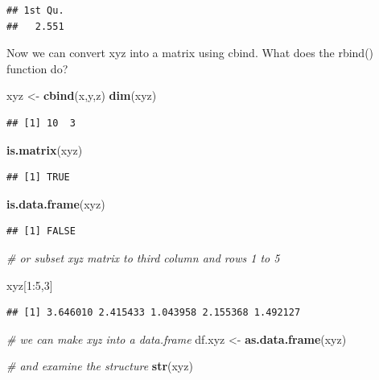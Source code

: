 \documentclass[]{article}
\newenvironment{Shaded}{}{}
\newcommand{\KeywordTok}[1]{\textcolor[rgb]{0.00,0.44,0.13}{\textbf{{#1}}}}
\newcommand{\DecValTok}[1]{\textcolor[rgb]{0.25,0.63,0.44}{{#1}}}
\newcommand{\StringTok}[1]{\textcolor[rgb]{0.25,0.44,0.63}{{#1}}}
\newcommand{\CommentTok}[1]{\textcolor[rgb]{0.38,0.63,0.69}{\textit{{#1}}}}
\newcommand{\NormalTok}[1]{{#1}}
\begin{document}
\begin{verbatim}
## 1st Qu. 
##   2.551
\end{verbatim}

Now we can convert xyz into a matrix using cbind. What does the rbind()
function do?

\begin{Shaded}
\begin{Highlighting}[]
\NormalTok{xyz <-}\StringTok{ }\KeywordTok{cbind}\NormalTok{(x,y,z)}
\KeywordTok{dim}\NormalTok{(xyz)}
\end{Highlighting}
\end{Shaded}

\begin{verbatim}
## [1] 10  3
\end{verbatim}

\begin{Shaded}
\begin{Highlighting}[]
\KeywordTok{is.matrix}\NormalTok{(xyz)}
\end{Highlighting}
\end{Shaded}

\begin{verbatim}
## [1] TRUE
\end{verbatim}

\begin{Shaded}
\begin{Highlighting}[]
\KeywordTok{is.data.frame}\NormalTok{(xyz)}
\end{Highlighting}
\end{Shaded}

\begin{verbatim}
## [1] FALSE
\end{verbatim}

\begin{Shaded}
\begin{Highlighting}[]
\CommentTok{# or subset xyz matrix to third column and rows 1 to 5}

\NormalTok{xyz[}\DecValTok{1}\NormalTok{:}\DecValTok{5}\NormalTok{,}\DecValTok{3}\NormalTok{]}
\end{Highlighting}
\end{Shaded}

\begin{verbatim}
## [1] 3.646010 2.415433 1.043958 2.155368 1.492127
\end{verbatim}

\begin{Shaded}
\begin{Highlighting}[]
\CommentTok{# we can make xyz into a data.frame}
\NormalTok{df.xyz <-}\StringTok{ }\KeywordTok{as.data.frame}\NormalTok{(xyz)}

\CommentTok{# and examine the structure}
\KeywordTok{str}\NormalTok{(xyz)}
\end{Highlighting}
\end{Shaded}
\end{document}
